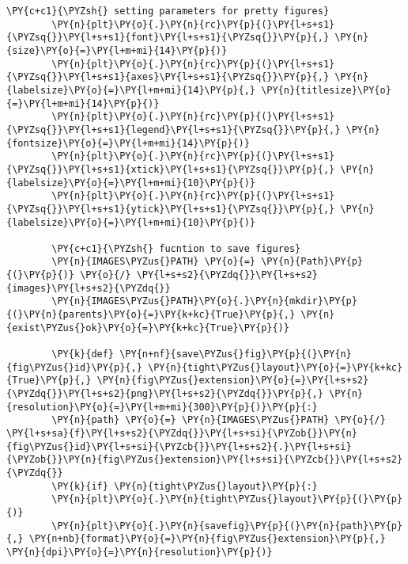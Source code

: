 \documentclass[a4paper,11pt]{article}%
\begin{document}
\begin{tcolorbox}[breakable, size=fbox, boxrule=1pt, pad at break*=1mm,colback=cellbackground, colframe=cellborder]
	\begin{Verbatim}[commandchars=\\\{\}]
		\PY{c+c1}{\PYZsh{} setting parameters for pretty figures}
		\PY{n}{plt}\PY{o}{.}\PY{n}{rc}\PY{p}{(}\PY{l+s+s1}{\PYZsq{}}\PY{l+s+s1}{font}\PY{l+s+s1}{\PYZsq{}}\PY{p}{,} \PY{n}{size}\PY{o}{=}\PY{l+m+mi}{14}\PY{p}{)}
		\PY{n}{plt}\PY{o}{.}\PY{n}{rc}\PY{p}{(}\PY{l+s+s1}{\PYZsq{}}\PY{l+s+s1}{axes}\PY{l+s+s1}{\PYZsq{}}\PY{p}{,} \PY{n}{labelsize}\PY{o}{=}\PY{l+m+mi}{14}\PY{p}{,} \PY{n}{titlesize}\PY{o}{=}\PY{l+m+mi}{14}\PY{p}{)}
		\PY{n}{plt}\PY{o}{.}\PY{n}{rc}\PY{p}{(}\PY{l+s+s1}{\PYZsq{}}\PY{l+s+s1}{legend}\PY{l+s+s1}{\PYZsq{}}\PY{p}{,} \PY{n}{fontsize}\PY{o}{=}\PY{l+m+mi}{14}\PY{p}{)}
		\PY{n}{plt}\PY{o}{.}\PY{n}{rc}\PY{p}{(}\PY{l+s+s1}{\PYZsq{}}\PY{l+s+s1}{xtick}\PY{l+s+s1}{\PYZsq{}}\PY{p}{,} \PY{n}{labelsize}\PY{o}{=}\PY{l+m+mi}{10}\PY{p}{)}
		\PY{n}{plt}\PY{o}{.}\PY{n}{rc}\PY{p}{(}\PY{l+s+s1}{\PYZsq{}}\PY{l+s+s1}{ytick}\PY{l+s+s1}{\PYZsq{}}\PY{p}{,} \PY{n}{labelsize}\PY{o}{=}\PY{l+m+mi}{10}\PY{p}{)}
		
		\PY{c+c1}{\PYZsh{} fucntion to save figures}
		\PY{n}{IMAGES\PYZus{}PATH} \PY{o}{=} \PY{n}{Path}\PY{p}{(}\PY{p}{)} \PY{o}{/} \PY{l+s+s2}{\PYZdq{}}\PY{l+s+s2}{images}\PY{l+s+s2}{\PYZdq{}}
		\PY{n}{IMAGES\PYZus{}PATH}\PY{o}{.}\PY{n}{mkdir}\PY{p}{(}\PY{n}{parents}\PY{o}{=}\PY{k+kc}{True}\PY{p}{,} \PY{n}{exist\PYZus{}ok}\PY{o}{=}\PY{k+kc}{True}\PY{p}{)}
		
		\PY{k}{def} \PY{n+nf}{save\PYZus{}fig}\PY{p}{(}\PY{n}{fig\PYZus{}id}\PY{p}{,} \PY{n}{tight\PYZus{}layout}\PY{o}{=}\PY{k+kc}{True}\PY{p}{,} \PY{n}{fig\PYZus{}extension}\PY{o}{=}\PY{l+s+s2}{\PYZdq{}}\PY{l+s+s2}{png}\PY{l+s+s2}{\PYZdq{}}\PY{p}{,} \PY{n}{resolution}\PY{o}{=}\PY{l+m+mi}{300}\PY{p}{)}\PY{p}{:}
		\PY{n}{path} \PY{o}{=} \PY{n}{IMAGES\PYZus{}PATH} \PY{o}{/} \PY{l+s+sa}{f}\PY{l+s+s2}{\PYZdq{}}\PY{l+s+si}{\PYZob{}}\PY{n}{fig\PYZus{}id}\PY{l+s+si}{\PYZcb{}}\PY{l+s+s2}{.}\PY{l+s+si}{\PYZob{}}\PY{n}{fig\PYZus{}extension}\PY{l+s+si}{\PYZcb{}}\PY{l+s+s2}{\PYZdq{}}
		\PY{k}{if} \PY{n}{tight\PYZus{}layout}\PY{p}{:}
		\PY{n}{plt}\PY{o}{.}\PY{n}{tight\PYZus{}layout}\PY{p}{(}\PY{p}{)}
		\PY{n}{plt}\PY{o}{.}\PY{n}{savefig}\PY{p}{(}\PY{n}{path}\PY{p}{,} \PY{n+nb}{format}\PY{o}{=}\PY{n}{fig\PYZus{}extension}\PY{p}{,} \PY{n}{dpi}\PY{o}{=}\PY{n}{resolution}\PY{p}{)}
	\end{Verbatim}
\end{tcolorbox}
\end{document}
